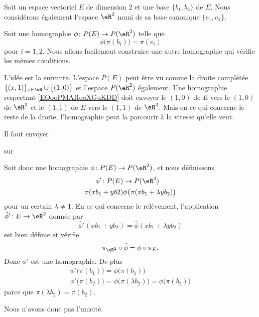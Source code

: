 \begin{example}
    Soit un espace vectoriel \( E\) de dimension \( 2\) et une base \(  \{ b_1,b_2 \}  \) de \( E\). Nous considérons également l'espace \( \eR^2\) muni de sa base canonique \( \{ e_1,e_2 \}\).

    Soit une homographie \( \phi\colon P(E)\to P(\eR^2)\) telle que 
    \begin{equation}        \label{EQooPMARooXGuKDD}
        \phi\big( \pi(b_i) \big)=\pi(e_i)
    \end{equation} 
    pour \( i=1,2\). Nous allons facilement construire une autre homographie qui vérifie les mêmes conditions.

    L'idée est la suivante. L'espace \( P(E)\) peut être vu comme la droite complétée \( \{ (  x,1   ) \}_{x\in \eR}\cup\{ (1,0) \} \) et l'espace \( P(\eR^2)\) également. Une homographie respectant \eqref{EQooPMARooXGuKDD} doit envoyer le \( (1,0)\) de \( E\) vers le \( (1,0)\) de \( \eR^2\) et le \( (1,1)\) de \( E\) vers le \( (1,1)\) de \( \eR^2\). Mais en ce qui concerne le reste de la droite, l'homographie peut la parcourir à la vitesse qu'elle veut.

    Il faut envoyer

    \begin{center}
   
   sur 
   
    \end{center}
    
    Soit donc une homographie \( \phi\colon P(E)\to P(\eR^2)\), et nous définissons
    \begin{equation}
        \begin{aligned}
            \phi'\colon P(E)&\to P(\eR^2) \\
            \pi(xb_1+yb2)& \phi\big( \pi(xb_1+\lambda yb_2) \big) 
        \end{aligned}
    \end{equation}
    pour un certain \( \lambda\neq 1\). En ce qui concerne le relèvement, l'application \( \bar\phi'\colon E\to \eR^2\) donnée par
    \begin{equation}
        \bar\phi'(xb_1+yb_2)=\bar\phi(xb_1+\lambda yb_2)
    \end{equation}
    est bien définie et vérifie
    \begin{equation}
        \pi_{\eR^2}\circ\bar\phi=\phi\circ\pi_E.
    \end{equation}
    Donc \( \phi'\) est une homographie. De plus 
    \begin{subequations}
        \begin{align}
            \phi'\big( \pi(b_1) \big)=\phi\big( \pi(b_1) \big)\\
            \phi'\big( \pi(b_2) \big)=\phi\big( \pi(\lambda b_2) \big)=\phi\big( \pi(b_2) \big)
        \end{align}
    \end{subequations}
    parce que \( \pi(\lambda b_2)=\pi(b_2)\).

    Nous n'avons donc pas l'unicité.
\end{example}

